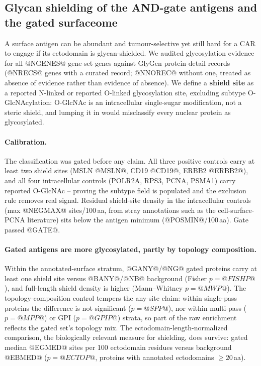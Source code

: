 \subsection{Glycan shielding of the AND-gate antigens and the gated surfaceome}
\label{sec:glygen}
A surface antigen can be abundant and tumour-selective yet still hard for a CAR
to engage if its ectodomain is glycan-shielded. We audited glycosylation
evidence for all @NGENES@ gene-set genes against GlyGen protein-detail records
(@NRECS@ genes with a curated record; @NNOREC@ without one, treated as absence
of evidence rather than evidence of absence). We define a \textbf{shield site}
as a reported N-linked or reported O-linked glycosylation site, excluding
subtype O-GlcNAcylation: O-GlcNAc is an intracellular single-sugar
modification, not a steric shield, and lumping it in would misclassify every
nuclear protein as glycosylated.

\paragraph{Calibration.} The classification was gated before any claim. All
three positive controls carry at least two shield sites (MSLN @MSLN@, CD19
@CD19@, ERBB2 @ERBB2@), and all four intracellular controls (POLR2A, RPS3,
PCNA, PSMA1) carry reported O-GlcNAc -- proving the subtype field is populated
and the exclusion rule removes real signal. Residual shield-site density in the
intracellular controls (max @NEGMAX@ sites/100\,aa, from stray annotations such
as the cell-surface-PCNA literature) sits below the antigen minimum
(@POSMIN@/100\,aa). Gate passed @GATE@.

\paragraph{Gated antigens are more glycosylated, partly by topology
composition.} Within the annotated-surface stratum, @GANY@/@NG@ gated proteins
carry at least one shield site versus @BANY@/@NB@ background (Fisher
$p = @FISHP@$), and full-length shield density is higher (Mann--Whitney
$p = @MWP@$). The topology-composition control tempers the any-site claim:
within single-pass proteins the difference is not significant ($p = @SPP@$),
nor within multi-pass ($p = @MPP@$) or GPI ($p = @GPIP@$) strata, so part of
the raw enrichment reflects the gated set's topology mix. The
ectodomain-length-normalized comparison, the biologically relevant measure for
shielding, does survive: gated median @EGMED@ sites per 100 ectodomain residues
versus background @EBMED@ ($p = @ECTOP@$, proteins with annotated ectodomains
$\geq 20$\,aa).

